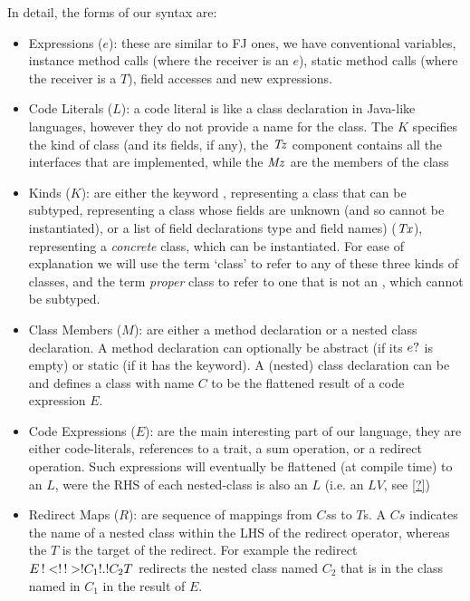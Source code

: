 In detail, the forms of our syntax are:
\begin{itemize}
	\item Expressions ($e$): these are similar to FJ ones, we have conventional variables, instance method calls (where the receiver is an $e$), static method calls (where the receiver is a $T$), field accesses and new expressions.
	
	\item Code Literals ($L$): a code literal is like a class declaration in Java-like languages, however they do not provide a name for the class. The $K$ specifies the kind of class (and its fields, if any), the $\mathit{Tz}$ component contains all the interfaces that are implemented, while the $\mathit{Mz}$ are the members of the class 
	
	\item Kinds ($K$): are either the keyword , representing a class that can be subtyped,  representing a class whose fields are unknown (and so cannot be instantiated), or a list of field declarations type and field names) ($\mathit{Tx}$), representing a \emph{concrete} class, which can be instantiated. For ease of explanation we will use the term `class' to refer to any of these three kinds of classes, and the term \emph{proper} class to refer to one that is not an , which cannot be subtyped.
	
	\item Class Members ($M$): are either a method declaration or a nested class declaration. A method declaration can optionally be abstract (if its $e?$ is empty) or static (if it has the  keyword). A (nested) class declaration can be  and defines a class with name $C$ to be the flattened result of a code expression $E$.	

	\item Code Expressions ($E$): are the main interesting part of our language, they are either code-literals, references to a trait, a sum operation, or a redirect operation. Such expressions will eventually be flattened (at compile time) to an $L$, were the RHS of each nested-class is also an $L$ (i.e. an $LV$, see \autoref{?})
	\item Redirect Maps ($R$): are sequence of mappings from $Cs$s to $T$s. A $Cs$ indicates the name of a nested class within the LHS of the redirect operator, whereas the $T$ is the target of the redirect. For example the redirect $\red{E}{C_1\.C_2}{T}$ redirects the nested class named $C_2$ that is in the class named in $C_1$ in the result of $E$.
	

\end{itemize}
